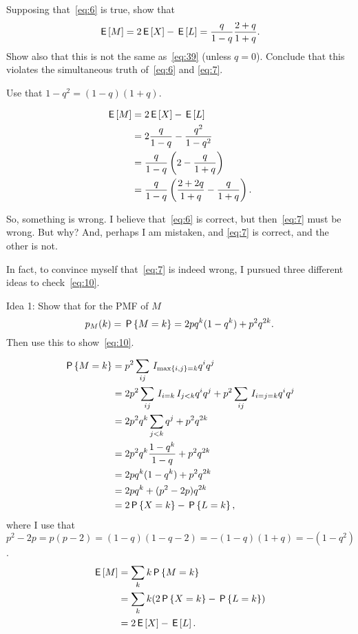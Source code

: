 \documentclass[a4paper,12pt]{article}
\begin{document}
\begin{exercise}
Supposing that~\cref{eq:6} is true, show that
\begin{equation}
  \label{eq:10}
\E M = 2\E X  -\E L = \frac q{1-q} \frac{2+q}{1+q}.
\end{equation}
Show also that this is not the same as~\cref{eq:39} (unless $q=0$).
Conclude that this violates the simultaneous truth of~\cref{eq:6} and \cref{eq:7}.
\begin{hint}
Use that $1-q^2=(1-q)(1+q)$.
\end{hint}
\begin{solution}
  \begin{align}
    \label{eq:11}
\E M 
&= 2\E X - \E L \\
&= 2\frac q{1-q}  - \frac{q^2}{1-q^2}\\
&= \frac q{1-q}\left(2  - \frac{q}{1+q}\right)\\
&= \frac q{1-q}\left(\frac{2+2q}{1+q}  - \frac{q}{1+q}\right).
  \end{align}
\end{solution}
\end{exercise}


So, something is wrong.
I believe that~\cref{eq:6} is correct, but then~\cref{eq:7} must be wrong.
But why?
And, perhaps I am mistaken, and \cref{eq:7} is correct, and the other is not.

In fact, to convince myself that~\cref{eq:7} is indeed wrong, I pursued three different ideas to check~\cref{eq:10}.

\begin{exercise}\label{ex:1}
Idea 1: Show that for the PMF of $M$ 
\begin{equation}
  \label{eq:34}
p_M(k) = \P{M=k} = 2 pq^{k}(1-q^{k}) + p^2q^{2k}.
\end{equation}
Then use this to show~\cref{eq:10}.
\begin{solution}
  \begin{align}
    \label{eq:14}
\P{M=k}     
&=p^{2}\sum_{ij}\1{\max{i,j} =k} q^i q^j\\
&=2 p^{2}\sum_{ij}\1{i=k}\1{j < k} q^i q^j + p^{2}\sum_{ij}\1{i=j=k} q^{i} q^j \\
&=2 p^{2}q^{k}\sum_{j < k} q^j + p^{2}q^{2k}\\
&=2 p^{2}q^{k}\frac{1-q^{k}}{1-q} +  p^{2}q^{2k}\\
&=2 pq^{k}(1-q^{k}) + p^{2}q^{2k}\\
&=2 pq^{k} +(p^{2}-2p) q^{2k} \label{eq:18}\\
&=2 \P{X=k} - \P{L=k},
  \end{align}
where I use that $p^{2}-2p = p(p-2) = (1-q)(1-q-2)=-(1-q)(1+q)=-(1-q^{2})$.
  \begin{align}
    \label{eq:15}
\E M 
&= \sum_k k \P{M=k}     \\
&=  \sum_{k}k (2\P{X=k} - \P{L=k}) \\
&= 2 \E X  - \E L.
  \end{align}
\end{solution}
\end{exercise}
\end{document}
